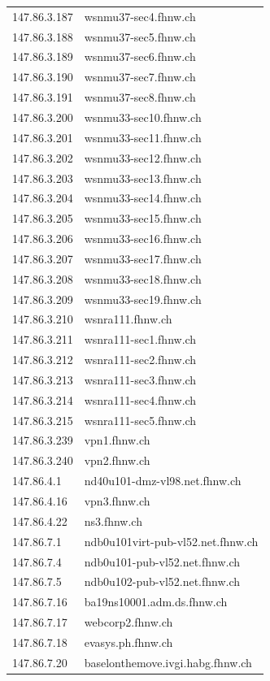 \documentclass[a4paper,11pt]{scrartcl}
\begin{document}
\begin{longtable}{p{2.5cm}|p{7cm}}
	147.86.3.187 & wsnmu37-sec4.fhnw.ch \\ 
	147.86.3.188 & wsnmu37-sec5.fhnw.ch \\ 
	147.86.3.189 & wsnmu37-sec6.fhnw.ch \\ 
	147.86.3.190 & wsnmu37-sec7.fhnw.ch \\ 
	147.86.3.191 & wsnmu37-sec8.fhnw.ch \\ 
	147.86.3.200 & wsnmu33-sec10.fhnw.ch \\ 
	147.86.3.201 & wsnmu33-sec11.fhnw.ch \\ 
	147.86.3.202 & wsnmu33-sec12.fhnw.ch \\ 
	147.86.3.203 & wsnmu33-sec13.fhnw.ch \\ 
	147.86.3.204 & wsnmu33-sec14.fhnw.ch \\ 
	147.86.3.205 & wsnmu33-sec15.fhnw.ch \\ 
	147.86.3.206 & wsnmu33-sec16.fhnw.ch \\ 
	147.86.3.207 & wsnmu33-sec17.fhnw.ch \\ 
	147.86.3.208 & wsnmu33-sec18.fhnw.ch \\ 
	147.86.3.209 & wsnmu33-sec19.fhnw.ch \\ 
	147.86.3.210 & wsnra111.fhnw.ch \\ 
	147.86.3.211 & wsnra111-sec1.fhnw.ch \\ 
	147.86.3.212 & wsnra111-sec2.fhnw.ch \\ 
	147.86.3.213 & wsnra111-sec3.fhnw.ch \\ 
	147.86.3.214 & wsnra111-sec4.fhnw.ch \\ 
	147.86.3.215 & wsnra111-sec5.fhnw.ch \\ 
	147.86.3.239 & vpn1.fhnw.ch \\ 
	147.86.3.240 & vpn2.fhnw.ch \\ 
	147.86.4.1 & nd40u101-dmz-vl98.net.fhnw.ch \\ 
	147.86.4.16 & vpn3.fhnw.ch \\ 
	147.86.4.22 & ns3.fhnw.ch \\ 
	147.86.7.1 & ndb0u101virt-pub-vl52.net.fhnw.ch \\ 
	147.86.7.4 & ndb0u101-pub-vl52.net.fhnw.ch \\ 
	147.86.7.5 & ndb0u102-pub-vl52.net.fhnw.ch \\ 
	147.86.7.16 & ba19ns10001.adm.ds.fhnw.ch \\ 
	147.86.7.17 & webcorp2.fhnw.ch \\ 
	147.86.7.18 & evasys.ph.fhnw.ch \\ 
	147.86.7.20 & baselonthemove.ivgi.habg.fhnw.ch \\ 

\end{longtable}
\end{document}
